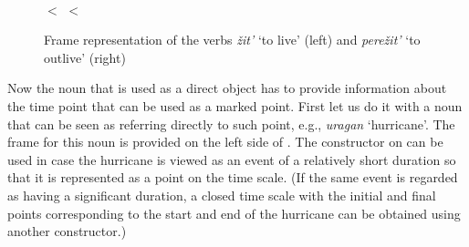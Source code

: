 \begin{figure}\small
\begin{minipage}{0.3\textwidth}\centering
{}
\end{minipage}\hfill%
\begin{minipage}{0.55\textwidth}\centering
{}\\
 $<$  $<$ 
\end{minipage}
\caption{Frame representation of the verbs \textit{\v{z}it'} `to live' (left) and \textit{pere\v{z}it'} `to outlive' (right) \label{frame:live}}
\end{figure}

Now the noun that is used as a direct object has to provide information about the time point that can be used as a marked point. First let us do it with a noun that can be seen as referring directly to such point, e.g., \textit{uragan} `hurricane'. The frame for this noun is provided on the left side of . The constructor on  can be used in case the hurricane is viewed as an event of a relatively short duration so that it is represented as a point on the time scale. (If the same event is regarded as having a significant duration, a closed time scale with the initial and final points corresponding to the start and end of the hurricane can be obtained using another constructor.) 

